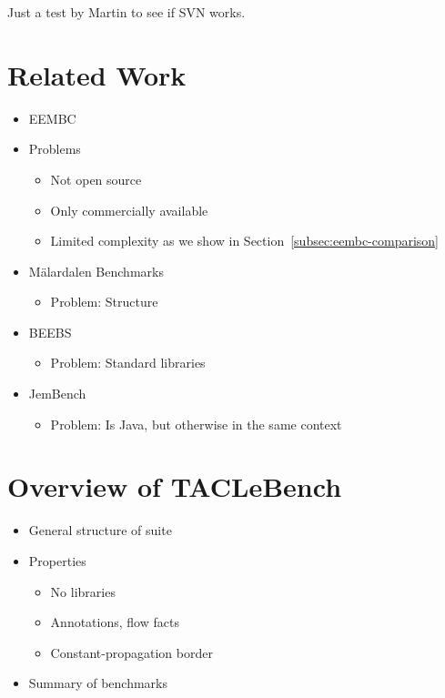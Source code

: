 \documentclass[a4paper,USenglish]{lites}
\begin{document}
Just a test by Martin to see if SVN works.

\section{Related Work}
\begin{itemize}
  \item EEMBC~\cite{poovey:2009:characterization}
  \item Problems
  \begin{itemize}
    \item Not open source
    \item Only commercially available
    \item Limited complexity as we show in Section~\ref{subsec:eembc-comparison}
  \end{itemize}
  \item M{\"a}lardalen Benchmarks~\cite{gustafsson:2010:wcet}
  \begin{itemize}
    \item Problem: Structure
  \end{itemize}
  \item BEEBS~\cite{Pallister2013}
  \begin{itemize}
    \item Problem: Standard libraries
  \end{itemize}
  \item JemBench~\cite{jembench}
  \begin{itemize}
    \item Problem: Is Java, but otherwise in the same context
  \end{itemize}
\end{itemize}

\section{Overview of TACLeBench}

\begin{itemize}
  \item General structure of suite
  \item Properties
  \begin{itemize}
    \item No libraries
    \item Annotations, flow facts
    \item Constant-propagation border
  \end{itemize}
  \item Summary of benchmarks
\end{itemize}
\end{document}
